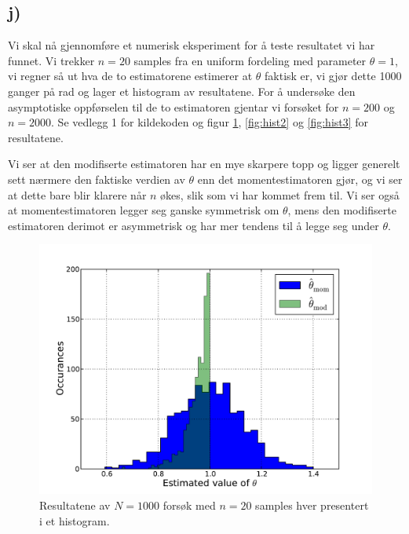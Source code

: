 \documentclass[a4paper, 11pt, titlepage, english]{article}
\begin{document}
\subsection*{j)}
Vi skal nå gjennomføre et numerisk eksperiment for å teste resultatet vi har funnet. Vi trekker $n=20$ samples fra en uniform fordeling med parameter $\theta=1$, vi regner så ut hva de to estimatorene estimerer at $\theta$ faktisk er, vi gjør dette 1000 ganger på rad og lager et histogram av resultatene. For å undersøke den asymptotiske oppførselen til de to estimatoren gjentar vi forsøket for $n=200$ og $n=2000$. Se vedlegg 1 for kildekoden og figur \ref{fig:hist}, \ref{fig:hist2} og \ref{fig:hist3} for resultatene. 

Vi ser at den modifiserte estimatoren har en mye skarpere topp og ligger generelt sett nærmere den faktiske verdien av $\theta$ enn det momentestimatoren gjør, og vi ser at dette bare blir klarere når $n$ økes, slik som vi har kommet frem til. Vi ser også at momentestimatoren legger seg ganske symmetrisk om $\theta$, mens den modifiserte estimatoren derimot er asymmetrisk og har mer tendens til å legge seg under $\theta$.

\begin{figure}
\centering
\includegraphics[width=\textwidth]{estimators_hist_n20.pdf}
\caption{Resultatene av $N=1000$ forsøk med $n=20$ samples hver presentert i et histogram. \label{fig:hist}}
\end{figure}
\end{document}
